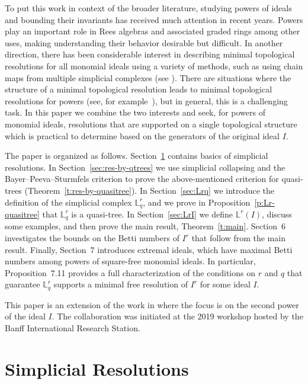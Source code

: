 \documentclass[11pt]{article}
\theoremstyle{definition}
\numberwithin{equation}{section}
\newcommand{\Lrq}{\mathbb{L}^r_q}
\newcommand{\Lr}{\mathbb{L}^r}
\begin{document}
To put this work in context of the broader literature, studying powers
of ideals and bounding their invariants has received much attention in
recent years. Powers play an important role in Rees algebras and
associated graded rings among other uses, making understanding their
behavior desirable but difficult. In another direction, there has been
considerable interest in describing minimal topological resolutions
for all monomial ideals using a variety of methods, such as using
chain maps from multiple simplicial complexes \textup{(}see \cite{EMO,
  Tch}\textup{)}. There are situations where the structure of a
minimal topological resolution leads to minimal topological
resolutions for powers (see, for example~\cite{morse,koszul,FH}), but in
general, this is a challenging task. In this paper we combine the two
interests and seek, for powers of monomial ideals, resolutions that
are supported on a single topological structure which is practical to
determine based on the generators of the original ideal $I$.

The paper is organized as follows. Section~\ref{sec:background} contains
basics of simplicial resolutions. In Section~\ref{sec:res-by-qtrees} we use
simplicial collapsing and the Bayer--Peeva--Sturmfels criterion to
prove the above-mentioned criterion for quasi-trees
\textup{(}Theorem~\ref{t:res-by-quasitree}\textup{)}.  In Section~\ref{sec:Lrq} we introduce the
definition of the simplicial complex $\Lrq$, and we prove in
Proposition~\ref{p:Lr-quasitree} that $\Lrq$ is a quasi-tree.  In Section~\ref{sec:LrI}
we define $\Lr(I)$, discuss some examples, and then prove the main
result, Theorem~\ref{t:main}. Section~6 investigates the bounds on the
Betti numbers of $I^r$ that follow from the main result.  Finally,
Section~7 introduces extremal ideals, which have maximal Betti
numbers among powers of square-free monomial ideals. In particular,
Proposition~7.11 provides a full characterization of the conditions on
$r$ and $q$ that guarantee $\Lrq$ supports a minimal free resolution
of $I^r$ for some ideal $I$.

This paper is an extension of the work in \cite{L2} where
the focus is on the second power of the ideal $I$.  The collaboration
was initiated at the 2019 workshop 
hosted by the Banff International Research Station.






\section{Simplicial Resolutions}
\label{sec:background}
\end{document}
